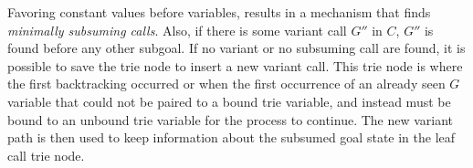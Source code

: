 Favoring constant values before variables, results in a mechanism that finds \textit{minimally subsuming calls}.
Also, if there is some variant call $G''$ in $C$, $G''$ is found before any other subgoal. If no variant 
or no subsuming call are found, it is possible to save the trie node to insert a new variant call.
This trie node is where the first backtracking occurred or when the first occurrence of
an already seen $G$ variable that could not be paired to a bound trie variable, and instead
must be bound to an unbound trie variable for the process to continue.
The new variant path is then used to keep information about the subsumed goal state in
the leaf call trie node.
